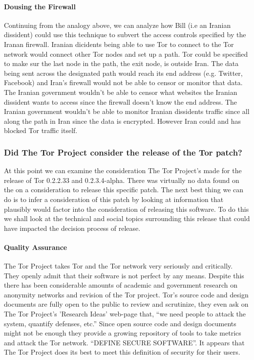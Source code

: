 \documentclass[11pt]{article}
\begin{document}
\begin{multicols}{2}
\paragraph{Dousing the Firewall}

Continuing from the analogy above, we can analyze how Bill (i.e an Iranian
dissident) could use this technique to subvert the access controls specified by
the Iranan firewall. Iranian dicidents being able to use Tor to connect to the
Tor network would connect other Tor nodes and set up a path. Tor could be
specified to make sur the last node in the path, the exit node, is outside Iran.
\cite{Tor:SpecificExitNode, Tor:FAQ} The data being sent across the designated
path would reach its end address (e.g.  Twitter, Facebook) and Iran's firewall
would not be able to censor or monitor that data. The Iranian government
wouldn't be able to censor what websites the Iranian dissident wants to access
since the firewall doesn't know the end address. The Iranian government wouldn't
be able to monitor Iranian dissidents traffic since all along the path in Iran
since the data is encrypted.  However Iran could and has blocked Tor traffic
itself.

\subsubsection{Did The Tor Project consider the release of the Tor patch?} 

At this point we can examine the consideration The Tor Project's made for the
release of Tor 0.2.2.33 and 0.2.3.4-alpha. There was virtually no data found on
the on a consideration to release this specific patch. The next best thing we
can do is to infer a consideration of this patch by looking at information that
plausibly would factor into the consideration of releasing this software. To do
this we shall look at the technical and social topics surrounding this release
that could have impacted the decision process of release.

\paragraph{Quality Assurance}

The Tor Project takes Tor and the Tor network very seriously and critically.
They openly admit that their software is not perfect by any means. Despite this
there has been considerable amounts of academic and government research on
anonymity networks and revision of the Tor project. \cite{Tor:ResearchPapers}
Tor's source code and design documents are fully open to the public to review
and scrutinize, they even ask on The Tor Project's 'Research Ideas' web-page
that, ``we need people to attack the system, quantify defenses, etc.''
\cite{Tor:ResearchIdeas, Tor:2011} Since open source code and design documents
might not be enough  they provide a growing repository of tools to take metrics
and attack the Tor network. \cite{Tor:ResearchHome} ``DEFINE SECURE SOFTWARE''.
It appears that The Tor Project does its best to meet this definition of
security for their users.  


\end{multicols}
\end{document}
